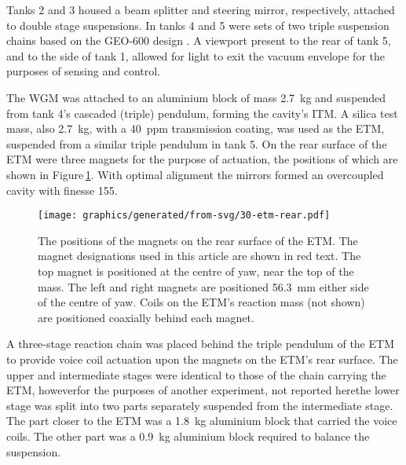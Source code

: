 Tanks 2 and 3 housed a beam splitter and steering mirror, respectively, attached to double stage suspensions. In tanks 4 and 5 were sets of two triple suspension chains based on the GEO-600 design \cite{Plissi2000}. A viewport present to the rear of tank 5, and to the side of tank 1, allowed for light to exit the vacuum envelope for the purposes of sensing and control.

The \gls{WGM} was attached to an aluminium block of mass \SI{2.7}{\kilo\gram} and suspended from tank 4's cascaded (triple) pendulum, forming the cavity's \gls{ITM}. A silica test mass, also \SI{2.7}{\kilo\gram}, with a \SI{40}{ppm} transmission coating, was used as the \gls{ETM}, suspended from a similar triple pendulum in tank 5. On the rear surface of the \gls{ETM} were three magnets for the purpose of actuation, the positions of which are shown in Figure\,\ref{fig:etm-rear}. With optimal alignment the mirrors formed an overcoupled cavity with finesse \num{155}.

\begin{figure}
  \centering
  \texttt{[image: graphics/generated/from-svg/30-etm-rear.pdf]}
  \caption{\label{fig:etm-rear}The positions of the magnets on the rear surface of the \gls{ETM}. The magnet designations used in this article are shown in red text. The top magnet is positioned at the centre of yaw, near the top of the mass. The left and right magnets are positioned \SI{56.3}{\milli\meter} either side of the centre of yaw. Coils on the \gls{ETM}'s reaction mass (not shown) are positioned coaxially behind each magnet.}
\end{figure}

A three-stage reaction chain was placed behind the triple pendulum of the \gls{ETM} to provide voice coil actuation upon the magnets on the \gls{ETM}'s rear surface. The upper and intermediate stages were identical to those of the chain carrying the \gls{ETM}, however\textemdash for the purposes of another experiment, not reported here\textemdash the lower stage was split into two parts separately suspended from the intermediate stage. The part closer to the \gls{ETM} was a \SI{1.8}{\kilo\gram} aluminium block that carried the voice coils. The other part was a \SI{0.9}{\kilo\gram} aluminium block required to balance the suspension.

